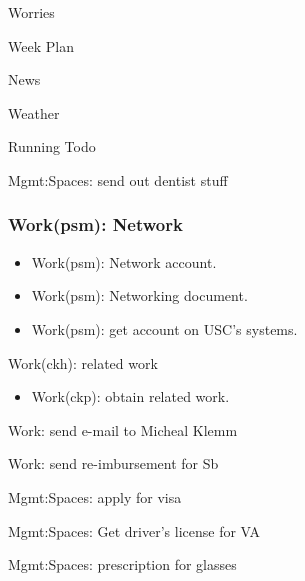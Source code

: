 \begin{frame}[ ]{Worries} 
\end{frame}

\begin{frame}[ ]{Week Plan}
\end{frame}

\begin{frame}{News}
\end{frame}

\begin{frame}[label=]{Weather}
\end{frame}

\begin{frame}[label=runningTodo]{Running Todo} 
\end{frame}


\begin{frame}{Mgmt:Spaces: send out dentist stuff} 
\end{frame}


\begin{frame} 
\frametitle{Work(psm): Network } 
\begin{itemize} 
\small \item \small Work(psm): Network account. 
\item \small Work(psm): Networking document. 
\item \small Work(psm): get account on USC's systems. 
\end{itemize} 
\end{frame}

\begin{frame}{ Work(ckh): related work}
\begin{itemize} 
\item \tiny Work(ckp): obtain related work. 
\end{itemize}
\end{frame} 

\begin{frame}{Work: send e-mail to Micheal Klemm} 
\end{frame}

\begin{frame}{Work: send re-imbursement for Sb} 
\end{frame}

\begin{frame}{Mgmt:Spaces: apply for visa} 
\end{frame}

\begin{frame}{Mgmt:Spaces: Get driver's license for VA} 
\end{frame}

\begin{frame}{Mgmt:Spaces: prescription for glasses}
\end{frame}
